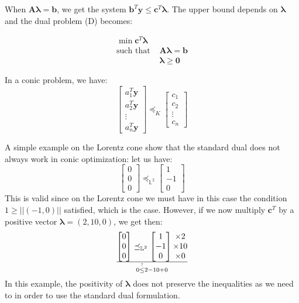 When $\boldsymbol{A\lambda}=\boldsymbol{b}$, we get the system $\boldsymbol{b}^T \boldsymbol{y} \leq \boldsymbol{c}^T \boldsymbol{\lambda}$. The upper bound depends on $\boldsymbol{\lambda}$ and the dual problem (D) becomes:

\begin{align*}
\min\boldsymbol{c}^T \boldsymbol{\lambda}&\\
  \textrm{such that }&\boldsymbol{A\lambda}=\boldsymbol{b}\\
             &\boldsymbol{\lambda} \geq \boldsymbol{0}
\end{align*}

In a conic problem, we have:
\[\begin{bmatrix}
 a_1^T \boldsymbol{y}\\
 a_2^T \boldsymbol{y}\\
 \vdots\\
 a_n^T \boldsymbol{y}
\end{bmatrix} \preceq_K \begin{bmatrix}
 c_1\\
 c_2\\
 \vdots\\
 c_n
\end{bmatrix}\]

A simple example on the Lorentz cone show that the standard dual does not always work in conic optimization: let us have:
\[\begin{bmatrix}
 0\\
 0\\
 0
\end{bmatrix} \preceq_{\mathbb{L}^2} \begin{bmatrix}
 1\\
 -1\\
 0
\end{bmatrix}\]
This is valid since on the Lorentz cone we must have in this case the condition $1\geq ||(-1,0)||$ satisfied, which is the case. However, if we now multiply $\boldsymbol{c}^T$ by a positive vector $\boldsymbol{\lambda}=(2,10,0)$, we get then:
\[\begin{bmatrix}
 0\\
 0\\
 0
\end{bmatrix} \preceq_{\mathbb{L}^2} \begin{bmatrix}
 1\\
 -1\\
 0
\end{bmatrix}\begin{matrix}
 \times 2\\
 \times 10\\
 \times 0
\end{matrix}\over
0 \stackrel{?}{\leq} 2-10+0\]
In this example, the positivity of $\boldsymbol{\lambda}$ does not preserve the inequalities as we need to in order to use the standard dual formulation.\\

